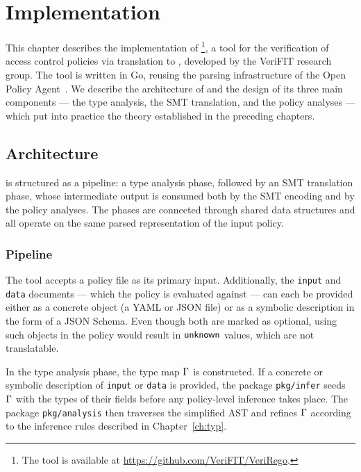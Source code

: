 \chapter{Implementation}
\label{ch:impl}

This chapter describes the implementation of \verirego\footnote{
  The tool is available at \url{https://github.com/VeriFIT/VeriRego}.
}, a tool for the verification of \rego access control policies via translation to \smtlib, developed by the VeriFIT research group.
The tool is written in Go, reusing the parsing infrastructure of the Open Policy Agent~\cite{opa:git}.
We describe the architecture of \verirego and the design of its three main components --- the type analysis, the SMT translation, and the policy analyses --- which put into practice the theory established in the preceding chapters.

\section{Architecture}
\label{s:arch}

\verirego{} is structured as a pipeline: a type analysis phase, followed by an SMT
translation phase, whose intermediate output is consumed both by the SMT encoding and
by the policy analyses.
The phases are connected through shared data structures and all operate on the same
parsed representation of the input policy.

\subsection{Pipeline}
\label{ss:pipeline}

The tool accepts a \rego{} policy file as its primary input.
Additionally, the \texttt{input} and \texttt{data} documents --- which the policy is
evaluated against --- can each be provided either as a concrete object (a YAML or JSON
file) or as a symbolic description in the form of a JSON Schema.
Even though both are marked as optional, using such objects in the policy would result in $\mathsf{unknown}$ values, which are not translatable.

In the type analysis phase, the type map $\Gamma$ is constructed.
If a concrete or symbolic description of \texttt{input} or \texttt{data} is provided,
the package \texttt{pkg/infer} seeds $\Gamma$ with the types of their fields before any
policy-level inference takes place.
The package \texttt{pkg/analysis} then traverses the simplified AST and refines $\Gamma$
according to the inference rules described in Chapter~\ref{ch:typ}.

